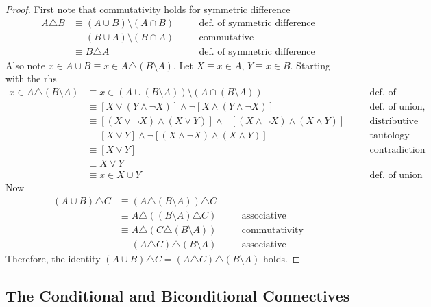 \begin{proof}
First note that commutativity holds for symmetric difference
\begin{align*}
A \triangle B &\equiv (A \cup B) \setminus (A \cap B) && \quad \text{def. of symmetric difference} \\
&\equiv (B \cup A) \setminus (B \cap A)  && \quad \text{commutative} \\
&\equiv B \triangle A && \quad \text{def. of symmetric difference}
\end{align*}
Also note $x \in A \cup B \equiv x \in A \triangle (B \setminus A)$.
Let $X \equiv x \in A$, $Y \equiv x \in B$.
Starting with the rhs
\begin{align*}
x \in A \triangle (B \setminus A) &\equiv x \in (A \cup (B \setminus A)) \setminus (A \cap (B \setminus A)) && \quad \text{def. of symmetric difference} \\
&\equiv [X \vee (Y \wedge \neg X)] \wedge \neg [X \wedge (Y \wedge \neg X)] && \quad \text{def. of union, intersection, set difference} \\
&\equiv [(X \vee \neg X) \wedge (X \vee Y)] \wedge \neg [(X \wedge \neg X) \wedge (X \wedge Y)] && \quad \text{distributive} \\
&\equiv [X \vee Y] \wedge \neg [(X \wedge \neg X) \wedge (X \wedge Y)] && \quad \text{tautology} \\
&\equiv [X \vee Y] && \quad \text{contradiction} \\
&\equiv X \vee Y && \quad \text{} \\
&\equiv x \in X \cup Y && \quad \text{def. of union}
\end{align*}
Now
\begin{align*}
(A \cup B) \triangle C &\equiv (A \triangle (B \setminus A)) \triangle C && \\
&\equiv A \triangle ((B \setminus A) \triangle C) && \quad \text{associative} \\
&\equiv A \triangle (C \triangle (B \setminus A)) && \quad \text{commutativity} \\
&\equiv (A \triangle C) \triangle (B \setminus A) && \quad \text{associative}
\end{align*}
Therefore, the identity $(A \cup B) \triangle C = (A \triangle C) \triangle (B \setminus A)$ holds.
\end{proof}

\subsection{The Conditional and Biconditional Connectives}

